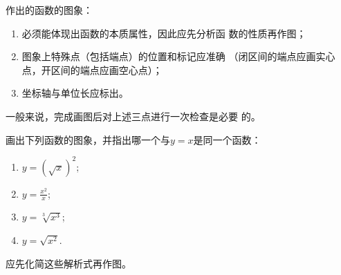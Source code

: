    

\begin{note}
    作出的函数的图象：
\begin{enumerate}[(1)]
\item 必须能体现出函数的本质属性，因此应先分析函
数的性质再作图；
\item 图象上特殊点（包括端点）的位置和标记应准确
（闭区间的端点应画实心点，开区间的端点应画空心点）；
\item 坐标轴与单位长应标出。
\end{enumerate}
\end{note}

一般来说，完成画图后对上述三点进行一次检查是必要
的。


\begin{example}
    画出下列函数的图象，并指出哪一个与$y=x$是同一个函数：
\begin{multicols}{2}
\begin{enumerate}[(1)]
    \item $y=\left(\sqrt{x}\right)^2$;
    \item $y=\frac{x^2}{x}$;
    \item $y=\sqrt[3]{x^3}$;
    \item $y=\sqrt{x^2}$.
\end{enumerate}
\end{multicols}
\end{example}

\begin{analyze}
    应先化简这些解析式再作图。
\end{analyze}

